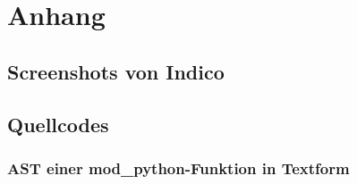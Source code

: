 \appendix
\captionsetup[figure]{list=no}
\setcounter{figure}{0}
\setcounter{lstlisting}{0}

\chapter{Anhang}

\section{Screenshots von Indico}


\section{Quellcodes}
\subsection{AST einer mod\_python-Funktion in Textform}


